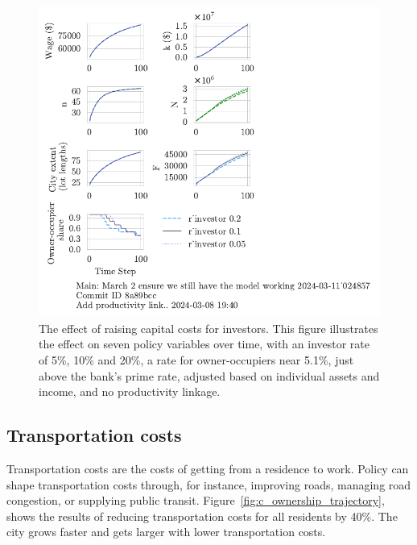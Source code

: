 \begin{figure}[h!t]
\raggedleft
\hspace{5cm}
\includegraphics[scale=0.9, trim={0 1.4cm 0 0},clip]{fig/r_investor-Main-024857.pdf}
\caption[The effect of raising capital costs for investors]{The effect of raising capital costs for investors. This figure illustrates the effect on seven policy variables over time, with an investor rate of 5\%, 10\% and 20\%, a rate for owner-occupiers near 5.1\%, just above the bank's prime rate, adjusted based on individual assets and income, and no productivity linkage.}
\label{fig:capital_ownership_trajectory}
\end{figure}

\newpage

\subsection{Transportation costs} 
Transportation costs are the costs of getting from a residence to work. Policy can shape transportation costs through, for instance, improving roads, managing road congestion, or supplying public transit. %
Figure~\ref{fig:c_ownership_trajectory}, shows the results of reducing transportation costs for all residents by 40\%. 
The city grows faster and gets larger with lower transportation costs. %

